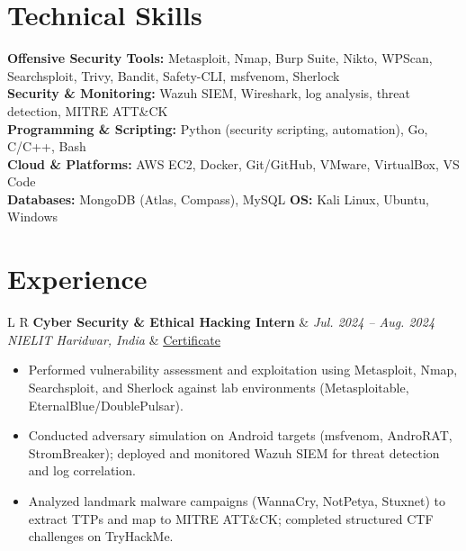 \documentclass[10pt,a4paper]{article}
\begin{document}
\section{Technical Skills}
\small
\textbf{Offensive Security Tools:} Metasploit, Nmap, Burp Suite, Nikto, WPScan, Searchsploit, Trivy, Bandit, Safety-CLI, msfvenom, Sherlock \\[3pt]
\textbf{Security \& Monitoring:} Wazuh SIEM, Wireshark, log analysis, threat detection, MITRE ATT\&CK \\[3pt]
\textbf{Programming \& Scripting:} Python (security scripting, automation), Go, C/C++, Bash \\[3pt]
\textbf{Cloud \& Platforms:} AWS EC2, Docker, Git/GitHub, VMware, VirtualBox, VS Code \\[3pt]
\textbf{Databases:} MongoDB (Atlas, Compass), MySQL \hspace{10pt} \textbf{OS:} Kali Linux, Ubuntu, Windows

\section{Experience}
\noindent
\begin{tabularx}{\textwidth}{L R}
  \textbf{Cyber Security \& Ethical Hacking Intern} & \textit{Jul. 2024 -- Aug. 2024} \\
  \textit{NIELIT Haridwar, India} & \href{https://5pyd3r.is-a.dev/assets/certs/intern-2024.pdf}{\textcolor{accent}{Certificate}} \\
\end{tabularx}
\vspace{3pt}
\begin{itemize}[leftmargin=3.5ex, itemsep=2.5pt, topsep=0pt]
  \small
  \item Performed vulnerability assessment and exploitation using Metasploit, Nmap, Searchsploit, and Sherlock against lab environments (Metasploitable, EternalBlue/DoublePulsar).
  \item Conducted adversary simulation on Android targets (msfvenom, AndroRAT, StromBreaker); deployed and monitored Wazuh SIEM for threat detection and log correlation.
  \item Analyzed landmark malware campaigns (WannaCry, NotPetya, Stuxnet) to extract TTPs and map to MITRE ATT\&CK; completed structured CTF challenges on TryHackMe.
\end{itemize}

\end{document}
